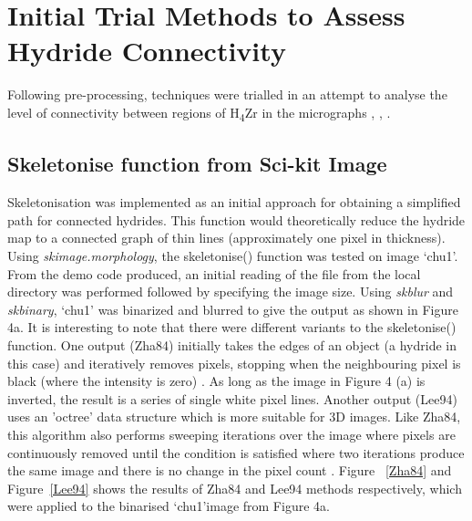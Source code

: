 \documentclass{article}
\begin{document}
	\section{Initial Trial Methods to Assess Hydride Connectivity}
	Following pre-processing, techniques were trialled in an attempt to analyse the level of connectivity between regions of H\textsubscript{4}Zr in the micrographs \cite{Sharma2018}, \cite{Simon2021}, \cite{Sunil2020}.

	\subsection{Skeletonise function from Sci-kit Image}
	Skeletonisation was implemented as an initial approach for obtaining a simplified path for connected hydrides. This function would theoretically reduce the hydride map to a connected graph of thin lines (approximately one pixel in thickness). Using \textit{skimage.morphology}, the skeletonise() function was tested on image ‘chu1’. From the demo code produced, an initial reading of the file from the local directory was performed followed by specifying the image size. Using \textit{skblur} and \textit {skbinary}, ‘chu1’ was binarized and blurred to give the output as shown in Figure 4a. It is interesting to note that there were different variants to the skeletonise() function. One output (Zha84) initially takes the edges of an object (a hydride in this case) and iteratively removes pixels, stopping when the neighbouring pixel is black (where the intensity is zero) \cite{Scikitimage}. As long as the image in Figure 4 (a) is inverted, the result is a series of single white pixel lines. Another output (Lee94) uses an 'octree' data structure which is more suitable for 3D images. Like Zha84, this algorithm also performs sweeping iterations over the image where pixels are continuously removed until the condition is satisfied where two iterations produce the same image and there is no change in the pixel count \cite{Scikitimage}. Figure ~\ref{Zha84}  and Figure~\ref{Lee94} shows the results of Zha84 and Lee94 methods respectively, which were applied to the binarised ‘chu1’image from Figure 4a.
\\
\end{document}
